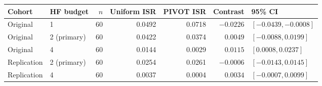 \begin{tabular}{@{}llrrrrl@{}}
\toprule
Cohort & HF budget & $n$ & Uniform ISR & PIVOT ISR & Contrast & 95\% CI \\
\midrule
Original & 1 & 60 & 0.0492 & 0.0718 & $-0.0226$ & $[-0.0439,-0.0008]$ \\
Original & 2 (primary) & 60 & 0.0422 & 0.0374 & $0.0049$ & $[-0.0088,0.0199]$ \\
Original & 4 & 60 & 0.0144 & 0.0029 & $0.0115$ & $[0.0008,0.0237]$ \\
Replication & 2 (primary) & 60 & 0.0254 & 0.0261 & $-0.0006$ & $[-0.0143,0.0145]$ \\
Replication & 4 & 60 & 0.0037 & 0.0004 & $0.0034$ & $[-0.0007,0.0099]$ \\
\bottomrule
\end{tabular}
